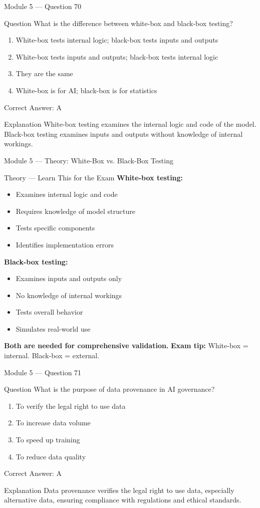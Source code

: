 \documentclass[aspectratio=169,10pt]{beamer}
\newcommand{\question}[1]{%
	\begin{block}{Question}
		#1
	\end{block}
}
\newcommand{\options}[4]{%
	\begin{enumerate}[label=\Alph*.,leftmargin=*]
		\item #1
		\item #2
		\item #3
		\item #4
	\end{enumerate}
}
\newcommand{\answerbox}[1]{%
	\begin{exampleblock}{Correct Answer: #1}
	\end{exampleblock}
}
\newcommand{\explain}[1]{%
	\begin{block}{Explanation}
		\small #1
	\end{block}
}
\newcommand{\theory}[1]{%
	\begin{block}{Theory --- Learn This for the Exam}
		\small #1
	\end{block}
}
\begin{document}
	\begin{frame}{Module 5 --- Question 70}
		\question{What is the difference between white-box and black-box testing?}
		\options{White-box tests internal logic; black-box tests inputs and outputs}{White-box tests inputs and outputs; black-box tests internal logic}{They are the same}{White-box is for AI; black-box is for statistics}
		\answerbox{A}
		\explain{White-box testing examines the internal logic and code of the model. Black-box testing examines inputs and outputs without knowledge of internal workings.}
	\end{frame}
	
	\begin{frame}{Module 5 --- Theory: White-Box vs. Black-Box Testing}
		\theory{
			\textbf{White-box testing:}
			\begin{itemize}
				\item Examines internal logic and code
				\item Requires knowledge of model structure
				\item Tests specific components
				\item Identifies implementation errors
			\end{itemize}
			\textbf{Black-box testing:}
			\begin{itemize}
				\item Examines inputs and outputs only
				\item No knowledge of internal workings
				\item Tests overall behavior
				\item Simulates real-world use
			\end{itemize}
			\textbf{Both are needed for comprehensive validation.}
			\textbf{Exam tip:} White-box = internal. Black-box = external.
		}
	\end{frame}
	
	\begin{frame}{Module 5 --- Question 71}
		\question{What is the purpose of data provenance in AI governance?}
		\options{To verify the legal right to use data}{To increase data volume}{To speed up training}{To reduce data quality}
		\answerbox{A}
		\explain{Data provenance verifies the legal right to use data, especially alternative data, ensuring compliance with regulations and ethical standards.}
	\end{frame}
	
\end{document}
